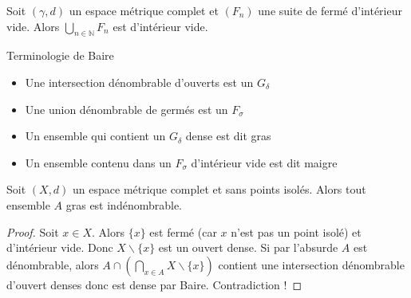 \begin{corollaire}
    Soit $(\gamma,d)$ un espace métrique complet et $(F_n)$ une suite de fermé d'intérieur vide. Alors $\bigcup\limits_{n\in \mathbb{N} } F_n$ est d'intérieur vide.
\end{corollaire}

Terminologie de Baire
\begin{itemize}
    \item Une intersection dénombrable d'ouverts est un $G_{\delta}$
    \item Une union dénombrable de germés est un $F_\sigma$
    \item Un ensemble qui contient un $G_{\delta}$ dense est dit gras
    \item Un ensemble contenu dans un $F_\sigma$ d'intérieur vide est dit maigre
\end{itemize}

\begin{remarque}
    Soit $(X,d)$ un espace métrique complet et sans points isolés. Alors tout ensemble $A$ gras est indénombrable.
\end{remarque}
\begin{proof}
    Soit $x\in X$. Alors $\{x\} $ est fermé (car $x$ n'est pas un point isolé) et d'intérieur vide. Donc $X\backslash \{x\} $ est un ouvert dense. Si par l'absurde $A$ est dénombrable, alors $A\cap \left( \bigcap\limits_{x\in A} X\backslash \{x\}  \right) $ contient une intersection dénombrable d'ouvert denses donc est dense par Baire. Contradiction !
\end{proof}

